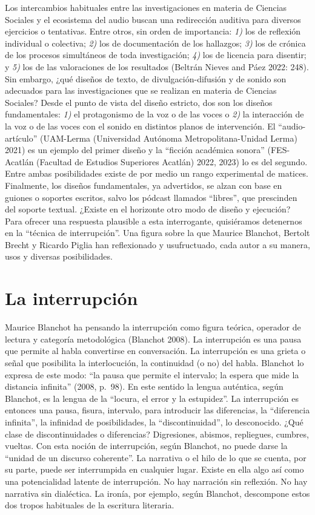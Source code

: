 \documentclass[
]{interact}
\begin{document}
Los intercambios habituales entre las investigaciones en materia de
Ciencias Sociales y el ecosistema del audio buscan una redirección
auditiva para diversos ejercicios o tentativas. Entre otros, sin orden
de importancia: \emph{1)} los de reflexión individual o colectiva;
\emph{2)} los de documentación de los hallazgos; \emph{3)} los de
crónica de los procesos simultáneos de toda investigación; \emph{4)} los
de licencia para disentir; y \emph{5)} los de las valoraciones de los
resultados (Beltrán Nieves and Páez 2022: 248). Sin embargo, ¿qué
diseños de texto, de divulgación-difusión y de sonido son adecuados para
las investigaciones que se realizan en materia de Ciencias Sociales?
Desde el punto de vista del diseño estricto, dos son los diseños
fundamentales: \emph{1)} el protagonismo de la voz o de las voces o
\emph{2)} la interacción de la voz o de las voces con el sonido en
distintos planos de intervención. El ``audio-artículo'' (UAM-Lerma
(Universidad Autónoma Metropolitana-Unidad Lerma) 2021) es un ejemplo
del primer diseño y la ``ficción académica sonora'' (FES-Acatlán
(Facultad de Estudios Superiores Acatlán) 2022, 2023) lo es del segundo.
Entre ambas posibilidades existe de por medio un rango experimental de
matices. Finalmente, los diseños fundamentales, ya advertidos, se alzan
con base en guiones o soportes escritos, salvo los pódcast llamados
``libres'', que prescinden del soporte textual. ¿Existe en el horizonte
otro modo de diseño y ejecución? Para ofrecer una respuesta plausible a
esta interrogante, quisiéramos detenernos en la ``técnica de
interrupción''. Una figura sobre la que Maurice Blanchot, Bertolt Brecht
y Ricardo Piglia han reflexionado y usufructuado, cada autor a su
manera, usos y diversas posibilidades.

\section{La interrupción}\label{la-interrupciuxf3n}

Maurice Blanchot ha pensando la interrupción como figura teórica,
operador de lectura y categoría metodológica (Blanchot 2008). La
interrupción es una pausa que permite al habla convertirse en
conversación. La interrupción es una grieta o señal que posibilita la
interlocución, la continuidad (o no) del habla. Blanchot lo expresa de
este modo: ``la pausa que permite el intervalo; la espera que mide la
distancia infinita'' (2008, p.~98). En este sentido la lengua auténtica,
según Blanchot, es la lengua de la ``locura, el error y la estupidez''.
La interrupción es entonces una pausa, fisura, intervalo, para
introducir las diferencias, la ``diferencia infinita'', la infinidad de
posibilidades, la ``discontinuidad'', lo desconocido. ¿Qué clase de
discontinuidades o diferencias? Digresiones, abismos, repliegues,
cumbres, vueltas. Con esta noción de interrupción, según Blanchot, no
puede darse la ``unidad de un discurso coherente''. La narrativa o el
hilo de lo que se cuenta, por su parte, puede ser interrumpida en
cualquier lugar. Existe en ella algo así como una potencialidad latente
de interrupción. No hay narración sin reflexión. No hay narrativa sin
dialéctica. La ironía, por ejemplo, según Blanchot, descompone estos dos
tropos habituales de la escritura literaria.
\end{document}
